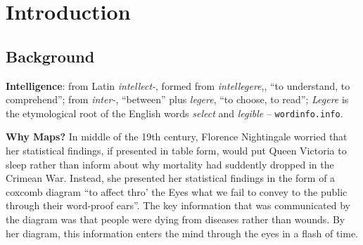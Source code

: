 \documentclass[11pt, oneside]{report}
\begin{document}
{%

\chapter{Introduction}
\label{chapter:introduction}

\vspace{-4ex}
\section{Background}
\label{sec:introduction:background}

\begin{emphpar}
\textbf{Intelligence}: from Latin \emph{intellect-}, formed from \emph{intellegere},, ``to understand, to comprehend''; from \emph{inter-}, ``between'' plus \emph{legere}, ``to choose, to read''; \emph{Legere} is the etymological root of the English words \emph{select} and \emph{legible} -- \texttt{wordinfo.info}. 
\end{emphpar}

\textbf{Why Maps?}
In middle of the 19th century, Florence Nightingale worried that her statistical findings, if presented in table form, would put Queen Victoria to sleep rather than inform about why mortality had suddently dropped in the Crimean War. Instead, she presented her statistical findings in the form of a coxcomb diagram ``to affect thro' the Eyes what we fail to convey to the public through their word-proof ears''. The key information that was communicated by the diagram was that people were dying from diseases rather than wounds. By her diagram, this information enters the mind through the eyes in a flash of time.

}
\end{document}
